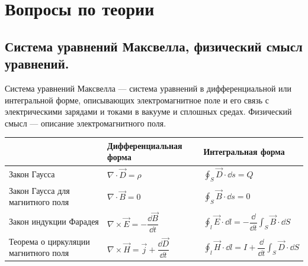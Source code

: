\documentclass[12pt]{report}
\begin{document}
\chapter*{Вопросы по теории}

\section{Система уравнений Максвелла, физический смысл уравнений.}
Система уравнений Максвелла — система уравнений в дифференциальной или интегральной форме, описывающих электромагнитное поле и его связь с электрическими зарядами и токами в вакууме и сплошных средах. Физический смысл --- описание электромагнитного поля.

\begin{tabular}{|l|l|l|}
    \hline
                                         & Дифференциальная форма                                        & Интегральная форма                                                                            \\
    \hline
    Закон Гаусса                         & $\displaystyle \nabla \cdot \vec D = \rho$                    & $\displaystyle \oint_S \vec D \cdot \dd s = Q$                                                \\
    \hline
    Закон Гаусса для магнитного поля     & $\nabla \cdot \vec B = 0$                                     & $\displaystyle \oint_S \vec B \cdot \dd s = 0$                                                \\
    \hline
    Закон индукции Фарадея               & $\nabla \times \vec E = -\dfrac{\dd{\vec B}}{\dd{t}}$         & $\displaystyle \oint_l \vec E \cdot \dd l = -\dfrac{\dd}{\dd{t}}\int_S \vec B \cdot \dd S$    \\
    \hline
    Теорема о циркуляции магнитного поля & $\nabla \times \vec H = \vec j + \dfrac{\dd{\vec D}}{\dd{t}}$ & $\displaystyle \oint_l \vec H \cdot \dd l = I + \dfrac{\dd}{\dd t} \int_S \vec D \cdot \dd S$ \\
    \hline
\end{tabular}
\end{document}
